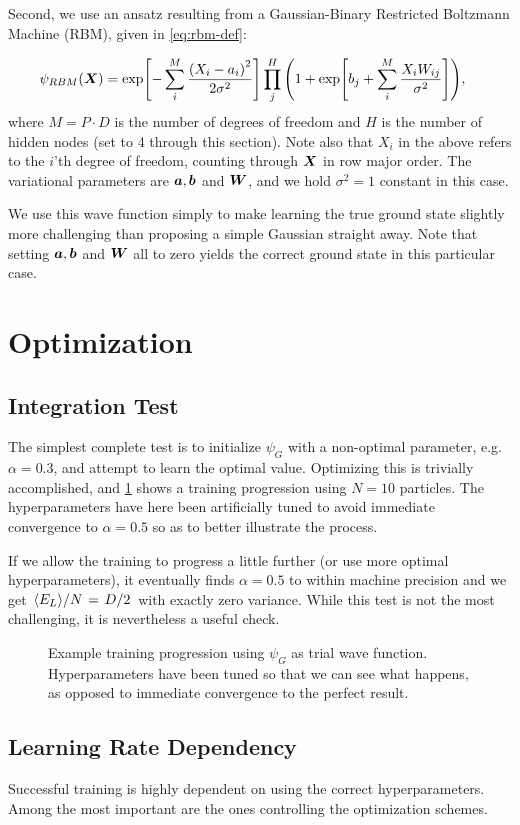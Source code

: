 \documentclass[Thesis.tex]{subfiles}
\begin{document}
Second, we use an ansatz resulting from a Gaussian-Binary Restricted Boltzmann
Machine (RBM), given in \cref{eq:rbm-def}:


\begin{align}
  \psi_{RBM}(\bm{X}) &=
        \exp[-\sum_i^{M} \frac{\qty(X_i-a_i)^2}{2\sigma^2}]
        \prod_j^H \qty(1 + \exp[b_j+\sum_i^M \frac{X_iW_{ij}}{\sigma^2}]),
\end{align}
where $M = P\cdot D$ is the number of degrees of freedom and $H$ is
the number of hidden nodes (set to 4 through this section). Note also that $X_i$
in the above refers to the $i$'th degree of freedom, counting through $\bm{X}$
in row major order. The variational parameters are $\bm{a}, \bm{b}$ and $\bm{W}$,
and we hold $\sigma^2=1$ constant in this case.

We use this wave function simply to make learning the true ground state slightly
more challenging than proposing a simple Gaussian straight away. Note that
setting $\bm{a}, \bm{b}$ and $\bm{W}$ all to zero yields the correct ground state in this particular case.


\section{Optimization}

\subsection{Integration Test}
The simplest complete test is to initialize $\psi_G$ with a non-optimal
parameter, e.g.\ $\alpha=0.3$, and attempt to learn the optimal value.
Optimizing this is trivially accomplished, and
\cref{fig:verify-gaussian-simplest} shows a training progression using $N=10$
particles. The hyperparameters have here been artificially tuned to avoid
immediate convergence to $\alpha =0.5$ so as to better illustrate
the process.

If we allow the training to progress a little further (or use more optimal
hyperparameters), it eventually finds
$\alpha = 0.5$ to within machine precision and we get
$\flatfrac{\expval{E_L}}{N} = \flatfrac{D}{2}$ with exactly zero variance. While
this test is not the most challenging, it is nevertheless a useful check.

\begin{figure}[h]
  \centering
    \resizebox{\linewidth}{!}{%
      
    }
  \caption{\label{fig:verify-gaussian-simplest}Example training progression using $\psi_G$ as trial wave function.
    Hyperparameters have been tuned so that we can see what happens, as opposed
    to immediate convergence to the perfect result.}
\end{figure}

\subsection{Learning Rate Dependency}

Successful training is highly dependent on using the correct hyperparameters.
Among the most important are the ones controlling the optimization schemes.
\end{document}
